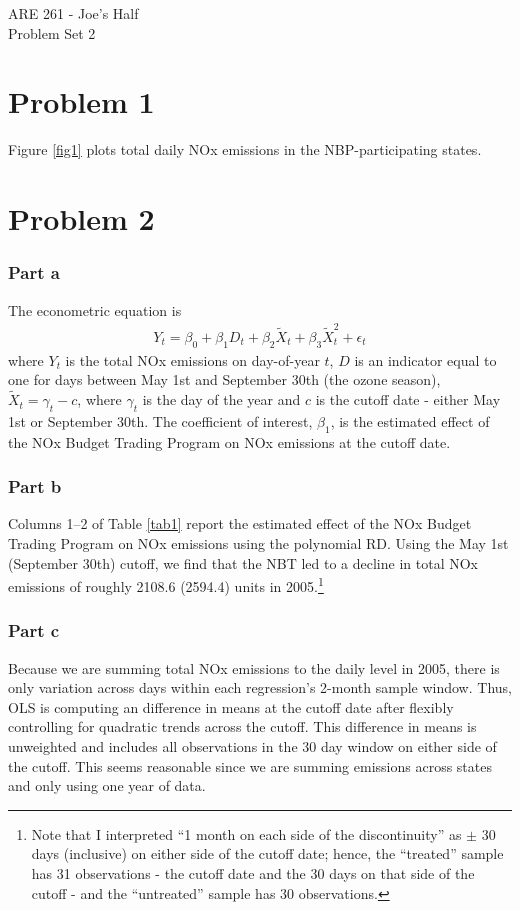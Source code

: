\documentclass[12pt]{article}
\begin{document}
\begin{center}
ARE 261 - Joe's Half \\
Problem Set 2
\end{center}

\section*{Problem 1}
Figure \ref{fig1} plots total daily NOx emissions in the NBP-participating states.

\section*{Problem 2}

\subsubsection*{Part a}
The econometric equation is
\begin{align}
	Y_t = \beta_0 + \beta_1 D_t + \beta_2 \tilde{X}_t + \beta_3 \tilde{X}_t^2 + \epsilon_t
\end{align}
where $Y_t$ is the total NOx emissions on day-of-year $t$, $ D$ is an indicator equal to one for days between May 1st and September 30th (the ozone season), $\tilde{X}_t = \gamma_t - c$, where $\gamma_t$ is the day of the year and $c$ is the cutoff date - either May 1st or September 30th. The coefficient of interest, $\beta_1$, is the estimated effect of the NOx Budget Trading Program on NOx emissions at the cutoff date.

\subsubsection*{Part b}
Columns 1--2 of Table \ref{tab1} report the estimated effect of the NOx Budget Trading Program on NOx emissions using the polynomial RD. Using the May 1st (September 30th) cutoff, we find that the NBT led to a decline in total NOx emissions of roughly 2108.6 (2594.4) units in 2005.\footnote{Note that I interpreted ``1 month on each side of the discontinuity'' as $\pm$ 30 days (inclusive) on either side of the cutoff date; hence, the ``treated'' sample has 31 observations - the cutoff date and the 30 days on that side of the cutoff - and the ``untreated'' sample has 30 observations.}

\subsubsection*{Part c}
Because we are summing total NOx emissions to the daily level in 2005, there is only variation across days within each regression's 2-month sample window. Thus, OLS is computing an difference in means at the cutoff date after flexibly controlling for quadratic trends across the cutoff. This difference in means is unweighted and includes all observations in the 30 day window on either side of the cutoff. This seems reasonable since we are summing emissions across states and only using one year of data.
\end{document}
